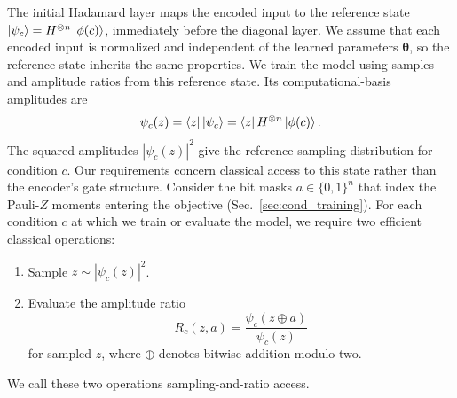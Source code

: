 \documentclass[pra,aps,10pt,twocolumn,floatfix,superscriptaddress, notitlepage,longbibliography]{revtex4-2}
\begin{document}
The initial Hadamard layer maps the encoded input to the reference state $\ket{\psi_c}=H^{\otimes n}\ket{\phi(c)}$, immediately before the diagonal layer. We assume that each encoded input is normalized and independent of the learned parameters $\boldsymbol\theta$, so the reference state inherits the same properties. We train the model using samples and amplitude ratios from this reference state. Its computational-basis amplitudes are
\begin{equation}
    \psi_c(z)
    =\bra{z}\ket{\psi_c}=\bra{z}H^{\otimes n}\ket{\phi(c)}.
    \label{eq:reference-amplitude}
\end{equation}
The squared amplitudes $|\psi_c(z)|^2$ give the reference sampling distribution for condition $c$. Our requirements concern classical access to this state rather than the encoder's gate structure. Consider the bit masks $a\in\{0,1\}^n$ that index the Pauli-$Z$ moments entering the objective (Sec.~\ref{sec:cond_training}). For each condition $c$ at which we train or evaluate the model, we require two efficient classical operations:
\begin{enumerate}
    \item Sample $z\sim |\psi_c(z)|^2$.
    \item Evaluate the amplitude ratio
    \begin{equation}
        R_c(z,a)
        =\frac{\psi_c(z\oplus a)}{\psi_c(z)}
        \label{eq:amplitude-ratio}
    \end{equation}
    for sampled $z$, where $\oplus$ denotes bitwise addition modulo two.
\end{enumerate}
We call these two operations sampling-and-ratio access.
\end{document}
